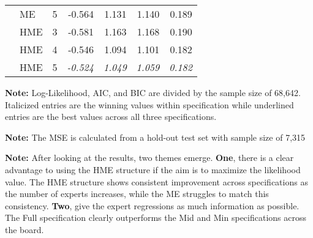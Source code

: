 \documentclass[12pt]{article}
\theoremstyle{definition}
\begin{document}
\begin{table}
\begin{threeparttable}
{\begin{tabular}[r]{l l l r r r r}
         &  ME   &    5    & -0.564  & 1.131  & 1.140  & 0.189 \\
         &  HME  &    3    & -0.581  & 1.163  & 1.168  & 0.190 \\
         &  HME  &    4    & -0.546  & 1.094  & 1.101  & 0.182 \\
         &  HME  &    5    & \it{-0.524}  & \it{1.049}  & \it{1.059}  & \it{0.182} \\
        \cmidrule(l){1-7}
    \end{tabular}
    }
    \begin{tablenotes}
      \item{\footnotesize \textbf{Note:} Log-Likelihood, AIC, and BIC are divided by the sample size of 68,642.
      Italicized entries are the winning values within specification while underlined entries are the best values across all three specifications.
      }
      \item{\footnotesize \textbf{Note:} The MSE is calculated from a hold-out test set with sample size of 7,315}
      \item{\footnotesize \textbf{Note:} After looking at the results, two themes emerge. \textbf{One}, there is a clear advantage to using the HME structure if the aim is to maximize the likelihood value.
      The HME structure shows consistent improvement across specifications as the number of experts increases,
      while the ME struggles to match this consistency. \textbf{Two}, give the expert regressions as much information as possible. The Full specification clearly outperforms the Mid and Min specifications across the board.
      }
      \item{\footnotesize }
    \end{tablenotes} \label{tbl:model_comparison}
  \end{threeparttable}
\end{table}
\end{document}
